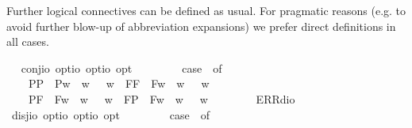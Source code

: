 \begin{isabellebody}
\isamarkuptrue%
%
\begin{isamarkuptext}%
Further logical connectives can be defined as usual. For pragmatic reasons (e.g. to avoid further blow-up of
  abbreviation expansions) we prefer direct definitions in all cases.%
\end{isamarkuptext}\isamarkuptrue%
\ \isamarkupfalse%
\ conj{\isacharcolon}{\isacharcolon}{\isachardoublequoteopen}io\ opt{\isasymRightarrow}io\ opt{\isasymRightarrow}io\ opt{\isachardoublequoteclose}\ {\isacharparenleft}\ {\isachardoublequoteopen}\isactrlbold {\isasymand}{\isachardoublequoteclose}\ {}{}{\isacharparenright}\ \ {\isachardoublequoteopen}{\isasymphi}\ \isactrlbold {\isasymand}\ {\isasympsi}\ {\isasymequiv}\ case\ {\isacharparenleft}{\isasymphi}{\isacharcomma}{\isasympsi}{\isacharparenright}\ of\isanewline
\ \ \ \ {\isacharparenleft}P{\isacharparenleft}{\isasymalpha}{\isacharparenright}{\isacharcomma}P{\isacharparenleft}{\isasymbeta}{\isacharparenright}{\isacharparenright}\ {\isasymRightarrow}\ P{\isacharparenleft}{\isasymlambda}w{\isachardot}\ {\isasymalpha}\ w\ {\isasymand}\ {\isasymbeta}\ w{\isacharparenright}\ {\isacharbar}\ {\isacharparenleft}F{\isacharparenleft}{\isasymalpha}{\isacharparenright}{\isacharcomma}F{\isacharparenleft}{\isasymbeta}{\isacharparenright}{\isacharparenright}\ {\isasymRightarrow}\ F{\isacharparenleft}{\isasymlambda}w{\isachardot}\ {\isasymalpha}\ w\ {\isasymand}\ {\isasymbeta}\ w{\isacharparenright}\ {\isacharbar}\ \isanewline
\ \ \ \ {\isacharparenleft}P{\isacharparenleft}{\isasymalpha}{\isacharparenright}{\isacharcomma}F{\isacharparenleft}{\isasymbeta}{\isacharparenright}{\isacharparenright}\ {\isasymRightarrow}\ F{\isacharparenleft}{\isasymlambda}w{\isachardot}\ {\isasymalpha}\ w\ {\isasymand}\ {\isasymbeta}\ w{\isacharparenright}\ {\isacharbar}\ {\isacharparenleft}F{\isacharparenleft}{\isasymalpha}{\isacharparenright}{\isacharcomma}P{\isacharparenleft}{\isasymbeta}{\isacharparenright}{\isacharparenright}\ {\isasymRightarrow}\ F{\isacharparenleft}{\isasymlambda}w{\isachardot}\ {\isasymalpha}\ w\ {\isasymand}\ {\isasymbeta}\ w{\isacharparenright}\ {\isacharbar}\ \isanewline
\ \ \ \ {\isacharunderscore}\ {\isasymRightarrow}\ ERR{\isacharparenleft}dio{\isacharparenright}{\isachardoublequoteclose}\ \ \isanewline
\isanewline
\ \isamarkupfalse%
\ disj{\isacharcolon}{\isacharcolon}{\isachardoublequoteopen}io\ opt{\isasymRightarrow}io\ opt{\isasymRightarrow}io\ opt{\isachardoublequoteclose}\ {\isacharparenleft}\ {\isachardoublequoteopen}\isactrlbold {\isasymor}{\isachardoublequoteclose}\ {}{}{\isacharparenright}\ \ {\isachardoublequoteopen}{\isasymphi}\ \isactrlbold {\isasymor}\ {\isasympsi}\ {\isasymequiv}\ case\ {\isacharparenleft}{\isasymphi}{\isacharcomma}{\isasympsi}{\isacharparenright}\ of\isanewline

\end{isabellebody}
